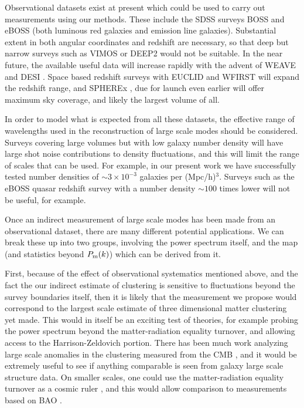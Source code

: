 \documentclass[prd,amsmath,amssymb,floatfix,superscriptaddress,nofootinbib,twocolumn]{revtex4-1}
\begin{document}
Observational datasets exist at present which could be used to carry out measurements using our methods. These include the SDSS surveys BOSS \cite{Dawson:2013boss} and eBOSS \cite{Dawson:2015wdb} (both luminous red galaxies and emission line galaxies). Substantial extent in both angular coordinates and redshift are necessary, so that deep but narrow surveys such as VIMOS \cite{Fevre:2014tna} or DEEP2 \cite{Coil:2005ap} would not be suitable. In the near future, the available useful data will increase rapidly with the advent of WEAVE \cite{Dalton:2014wv} and DESI \cite{DESI:2019ds}. Space based redshift surveys  with EUCLID \cite{Amiaux:2012ec} and WFIRST \cite{Wfirst:2012jg} will expand the redshift range, and SPHEREx \cite{Dore:2014cca}, due for launch even earlier will offer maximum sky coverage, and likely the largest volume of all.

In order to model what is expected from all these datasets, the effective range of wavelengths used in the reconstruction of large scale modes should be considered. Surveys covering large volumes but with low galaxy number density will have large shot noise contributions to density fluctuations, and this will limit the range of scales that can be used. For example, in our present work we have successfully tested number densities of $\sim 3\times10^{-3}$ galaxies per (Mpc/h)$^{3}$. Surveys such as the eBOSS quasar redshift survey \cite{Ata:2017dya} with a number density $\sim 100$ times lower will not be useful, for example.

Once an indirect measurement of large scale modes has been made from an observational dataset, there are many different potential applications. We can break these up into two groups, involving the power spectrum itself, and the map (and statistics beyond $P_{\rm m}(k)$) which can be derived from it.

First, because of the effect of observational systematics mentioned above, and the fact the our indirect estimate of clustering is sensitive to fluctuations beyond the survey boundaries itself, then it is likely that the measurement we propose would correspond to the largest scale estimate of three dimensional matter clustering yet made. This would in itself be an exciting test of theories, for example probing the power spectrum beyond the matter-radiation equality turnover, and allowing access to the Harrison-Zeldovich portion. There has been much work analyzing large scale anomalies in the clustering measured from the CMB \cite{Copi:2010na}\cite{Rassat:2014yna}\cite{Schwarz:2015cma}, and it would be extremely useful to see if anything comparable is seen from galaxy large scale structure data. On smaller scales, one could use the matter-radiation equality turnover as a cosmic ruler \cite{Hasenkamp:2012ii}, and this would allow comparison to measurements based on BAO \cite{Lazkoz:2007cc}.
\end{document}
